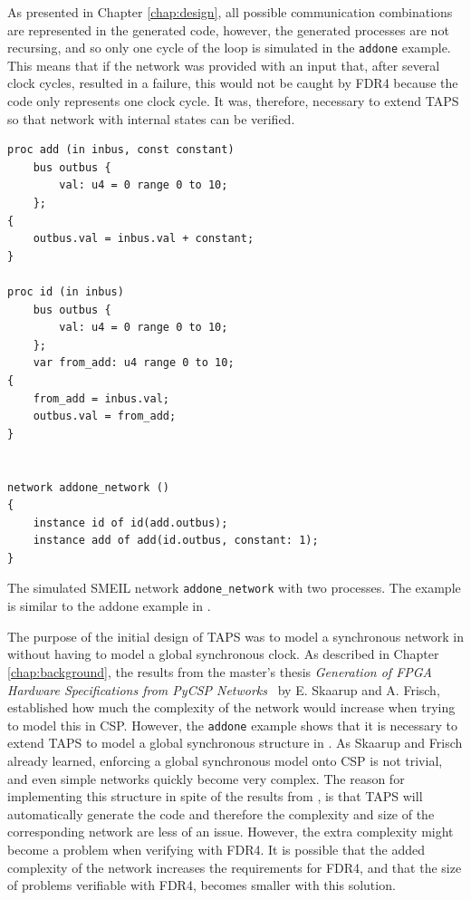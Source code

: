 As presented in Chapter \ref{chap:design}, all possible communication combinations are represented in the generated \cspm{} code, however, the generated \cspm{} processes are not recursing, and so only one cycle of the loop is simulated in the \texttt{addone} example. This means that if the network was provided with an input that, after several clock cycles, resulted in a failure, this would not be caught by FDR4 because the \cspm{} code only represents one clock cycle. It was, therefore, necessary to extend TAPS so that network with internal states can be verified.\\
\begin{listing}
\begin{verbatim}
proc add (in inbus, const constant)
    bus outbus {
        val: u4 = 0 range 0 to 10;
    };
{
    outbus.val = inbus.val + constant;
}

proc id (in inbus)
    bus outbus {
        val: u4 = 0 range 0 to 10;
    };
    var from_add: u4 range 0 to 10;
{
    from_add = inbus.val;
    outbus.val = from_add;
}


network addone_network ()
{
    instance id of id(add.outbus);
    instance add of add(id.outbus, constant: 1);
}
\end{verbatim}
\caption{The simulated SMEIL network \texttt{addone\_network} with two processes. The example is similar to the addone example in \cite{smeil}.}
\label{lst:addone_smeil_example}
\end{listing}

The purpose of the initial design of TAPS was to model a synchronous network in \cspm{} without having to model a global synchronous clock. As described in Chapter \ref{chap:background}, the results from the master's thesis \textit{Generation of FPGA Hardware
Specifications from PyCSP Networks}~\cite{Skaarup14} by E. Skaarup and A. Frisch, established how much the complexity of the network would increase when trying to model this in CSP.
However, the \texttt{addone} example shows that it is necessary to extend TAPS to model a global synchronous structure in \cspm{}. As Skaarup and Frisch already learned, enforcing a global synchronous model onto CSP is not trivial, and even simple networks quickly become very complex. The reason for implementing this structure in spite of the results from \cite{Skaarup14}, is that TAPS will automatically generate the \cspm{} code and therefore the complexity and size of the corresponding \cspm{} network are less of an issue. However, the extra complexity might become a problem when verifying with FDR4. It is possible that the added complexity of the network increases the requirements for FDR4, and that the size of problems verifiable with FDR4, becomes smaller with this solution. \\

